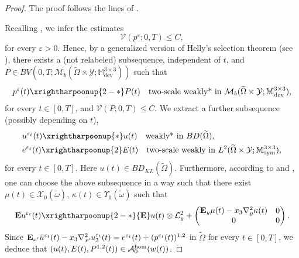 \documentclass[reqno,10pt]{amsart}
\numberwithin{equation}{section}
\theoremstyle{remark}
\newcommand{\calA}{\mathcal{A}}
\newcommand{\calL}{\mathcal{L}}
\newcommand{\M}{\mathbb{M}}
\newcommand{\calV}{\mathcal{V}}
\newcommand{\calY}{\mathcal{Y}}
\DeclareMathOperator{\dev}{dev}
\DeclareMathOperator{\sym}{sym}
\newcommand{\weakstar}{\xrightharpoonup{*}}
\newcommand{\weaktwoscale}{\xrightharpoonup{2}}
\newcommand{\weakstartwoscale}{\xrightharpoonup{2-*}}
\newcommand{\eps}{\varepsilon}
\newcommand{\Mb}{\mathcal{M}_b}
\newcommand{\calXzero}[1]{\mathcal{X}_0({#1})}
\newcommand{\calYzero}[1]{\Upsilon_0({#1})}
\newcommand{\ext}[1]{\widetilde{#1}}
\newcommand{\E}{{\bf E}}
\newcommand{\D}{\nabla}
\begin{document}
\begin{proof}
The proof follows the lines of . 


Recalling , we infer the estimates
\begin{equation} \label{boundness in time 3}
	\calV(p^\eps; 0, T) \leq C,
\end{equation}
for every $\eps>0$. 
Hence, by a generalized version of Helly's selection theorem (see \cite[Lemma 7.2]{DalMaso.DeSimone.Mora.2006}), there exists a (not relabeled) subsequence, independent of $t$, and $P \in BV(0,T;\Mb(\ext{\Omega} \times \calY;\M^{3 \times 3}_{\dev}))$ such that
\begin{equation*}
	p^\eps(t) \weakstartwoscale P(t) \quad \text{two-scale weakly* in $\Mb(\ext{\Omega} \times \calY;\M^{3 \times 3}_{\dev})$},
\end{equation*}
for every $t \in [0,T]$, and $\calV(P; 0, T) \leq C$.
We extract a further subsequence (possibly depending on $t$),
\begin{align*}
	& u^{\eps_t}(t) \weakstar u(t) \quad \text{weakly* in $BD(\ext{\Omega})$},\\
	& e^{\eps_t}(t) \weaktwoscale E(t) \quad \text{two-scale weakly in $L^2(\ext{\Omega} \times \calY;\M^{3 \times 3}_{\sym})$},
\end{align*}
for every $t \in [0,T]$. Here $u(t) \in BD_{KL}(\ext{\Omega})$. 
Furthermore, according to  and , one can choose the above subsequence in a way such that there exist $\mu(t) \in \calXzero{\ext{\omega}}$, $\kappa(t) \in \calYzero{\ext{\omega}}$ such that
\begin{equation*}
	{\E}u^{\eps_t}(t) \weakstartwoscale {\E}u(t) \otimes \calL^{2}_{y} + \begin{pmatrix} \begin{matrix} {\E}_{y}\mu(t) - x_3 {\D}^2_{y}\kappa(t) \end{matrix} & 0 \\ 0 & 0 \end{pmatrix}.
\end{equation*}
Since ${\E}_{x'}\bar{u}^{\eps_t}(t) - x_3 {\D}^2_{x'}u_3^{\eps_t}(t) = e^{\eps_t}(t) + (p^{\eps_t}(t))^{1,2}$ in $\ext{\Omega}$ for every $t \in [0,T]$, we deduce that $(u(t),E(t),P^{1,2}(t)) \in \calA^{\rm hom}_{0}(w(t))$.


\end{proof}
\end{document}
